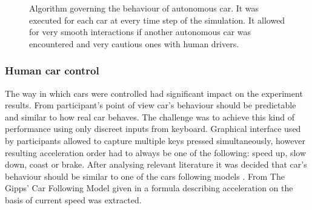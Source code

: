 \documentclass[11pt,english]{article}
\begin{document}
\begin{figure}[!] %
\caption{Algorithm governing the behaviour of autonomous car. It was executed for each car at every time step of the simulation. It allowed for very smooth interactions if another autonomous car was encountered and very cautious ones with human drivers.}
\label{fig:idm_upgrade}
\end{figure} 


\subsubsection{Human car control}

The way in which cars were controlled had significant impact on the experiment results. From participant's point of view car's behaviour should be predictable and similar to how real car behaves. The challenge was to achieve this kind of performance using only discreet inputs from keyboard. Graphical interface used by participants allowed to capture multiple keys pressed simultaneously, however resulting acceleration order had to always be one of the following: speed up, slow down, coast or brake. After analysing relevant literature it was decided that car's behaviour should be similar to one of the cars following models \citep{treiber2013traffic}. From The Gipps' Car Following Model given in \citet{spyropoulou2007simulation} a formula describing acceleration on the basis of current speed was extracted.
\end{document}
